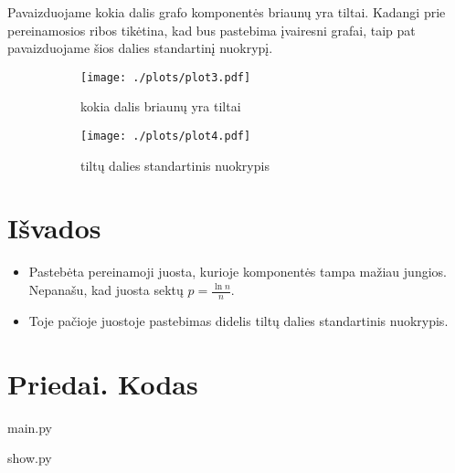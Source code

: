 \documentclass[bibliography=totoc]{article}
\begin{document}
Pavaizduojame kokia dalis grafo komponentės briaunų yra tiltai. Kadangi prie pereinamosios ribos tikėtina, kad bus pastebima įvairesni grafai, taip pat pavaizduojame šios dalies standartinį nuokrypį.
\begin{figure}[H]
    \begin{subfigure}{.5\textwidth}
        \begin{center}
            \texttt{[image: ./plots/plot3.pdf]}
        \end{center}
        \caption{kokia dalis briaunų yra tiltai}
    \end{subfigure}
    \begin{subfigure}{.5\textwidth}
        \begin{center}
            \texttt{[image: ./plots/plot4.pdf]}
        \end{center}
        \caption{tiltų dalies standartinis nuokrypis}
    \end{subfigure}
    \caption{}
\end{figure}

\newpage 
\section*{Išvados}
\label{sec:isvados}
\begin{itemize}
    \item{Pastebėta pereinamoji juosta, kurioje komponentės tampa mažiau jungios. Nepanašu, kad juosta sektų $p = \frac{\ln n}{n}$.}
    \item{Toje pačioje juostoje pastebimas didelis tiltų dalies standartinis nuokrypis.}
\end{itemize}

\newpage 


\newpage 
\appendix
\section*{Priedai. Kodas}
\label{sec:priedas}
 
\lstset{style=mystyle}
main.py

show.py

\end{document}
